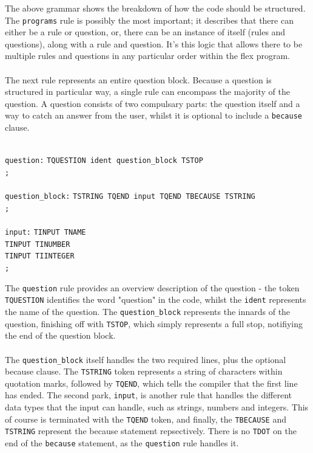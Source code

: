 \documentclass[12pt]{report}
\begin{document}
The above grammar shows the breakdown of how the code should be structured.  The \texttt{programs} rule is possibly the most important; it describes that there can either be a rule or question, or, there can be an instance of itself (rules and questions), along with a rule and question.  It's this logic that allows there to be multiple rules and questions in any particular order within the flex program.\\
\\
The next rule represents an entire question block.  Because a question is structured in particular way, a single rule can encompass the majority of the question.  A question consists of two compulsary parts: the question itself and a way to catch an answer from the user, whilst it is optional to include a \texttt{because} clause.\\
\\
\begin{tabbing}
	\texttt{question:} \= \texttt{TQUESTION ident question\_block TSTOP}\\
	\> \texttt{;}\\
	\\
	\texttt{question\_block:} \= \texttt{TSTRING TQEND input TQEND TBECAUSE TSTRING}\\
	\> \texttt{;}\\
	\\
	\texttt{input:} \= \texttt{TINPUT TNAME}\\
	\> \texttt{\textbar \space TINPUT TINUMBER}\\
	\> \texttt{\textbar \space TINPUT TIINTEGER}\\
	\> \texttt{;}\\
\end{tabbing}
The \texttt{question} rule provides an overview description of the question - the token \texttt{TQUESTION} identifies the word "question" in the code, whilst the \texttt{ident} represents the name of the question.  The \texttt{question\_block} represents the innards of the question, finishing off with \texttt{TSTOP}, which simply represents a full stop, notifiying the end of the question block.\\
\\
The \texttt{question\_block} itself handles the two required lines, plus the optional because clause.  The \texttt{TSTRING} token represents a string of characters within quotation marks, followed by \texttt{TQEND}, which tells the compiler that the first line has ended.  The second park, \texttt{input}, is another rule that handles the different data types that the input can handle, such as strings, numbers and integers.  This of course is terminated with the \texttt{TQEND} token, and finally, the \texttt{TBECAUSE} and \texttt{TSTRING} represent the because statement repsectively.  There is no \texttt{TDOT} on the end of the \texttt{because} statement, as the \texttt{question} rule handles it.\\
\end{document}
